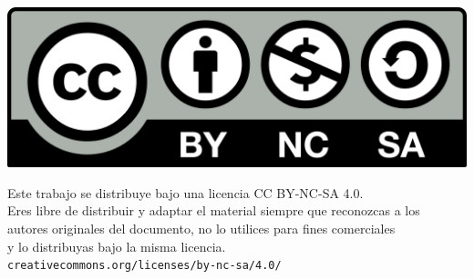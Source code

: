 \documentclass[10pt,a4paper]{article}
\begin{document}
\parbox[t]{\textwidth}{
  \includegraphics[scale=0.05]{by-nc-sa.png}\\[4pt]
  \raggedright %
  \sffamily\large
  {\Large Este trabajo se distribuye bajo una licencia CC BY-NC-SA 4.0.}\\[4pt]
  Eres libre de distribuir y adaptar el material siempre que reconozcas a los\\
  autores originales del documento, no lo utilices para fines comerciales\\
  y lo distribuyas bajo la misma licencia.\\[4pt]
  \texttt{creativecommons.org/licenses/by-nc-sa/4.0/}
}

\newpage

\tableofcontents

\newpage
\end{document}
